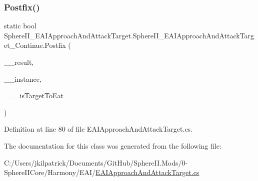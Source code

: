 \subsubsection{\texorpdfstring{Postfix()}{Postfix()}}
{\footnotesize\ttfamily static bool Sphere\+I\+I\+\_\+\+E\+A\+I\+Approach\+And\+Attack\+Target.\+Sphere\+I\+I\+\_\+\+E\+A\+I\+Approach\+And\+Attack\+Target\+\_\+\+Continue.\+Postfix (\begin{DoxyParamCaption}\item[{bool}]{\+\_\+\+\_\+result,  }\item[{E\+A\+I\+Approach\+And\+Attack\+Target}]{\+\_\+\+\_\+instance,  }\item[{ref bool}]{\+\_\+\+\_\+\+\_\+is\+Target\+To\+Eat }\end{DoxyParamCaption})\hspace{0.3cm}{\ttfamily [static]}}



Definition at line 80 of file E\+A\+I\+Approach\+And\+Attack\+Target.\+cs.



The documentation for this class was generated from the following file\+:\begin{DoxyCompactItemize}
\item 
C\+:/\+Users/jkilpatrick/\+Documents/\+Git\+Hub/\+Sphere\+I\+I.\+Mods/0-\/\+Sphere\+I\+I\+Core/\+Harmony/\+E\+A\+I/\mbox{\hyperlink{_e_a_i_approach_and_attack_target_8cs}{E\+A\+I\+Approach\+And\+Attack\+Target.\+cs}}\end{DoxyCompactItemize}
